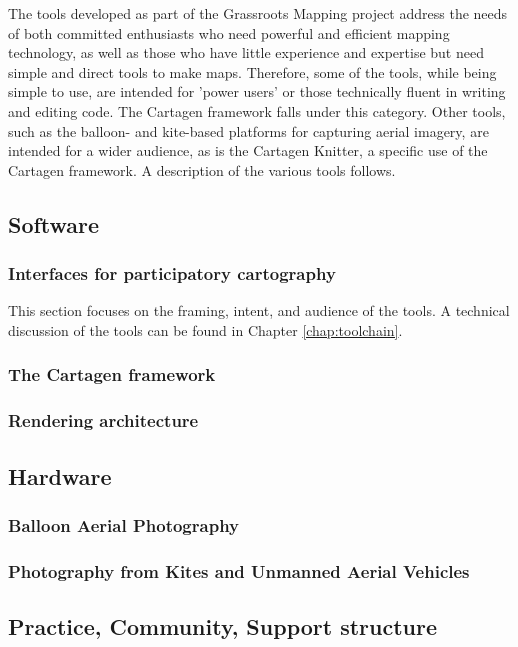 \documentclass[11pt]{report}
\begin{document}
The tools developed as part of the Grassroots Mapping project address the needs of both committed enthusiasts who need powerful and efficient mapping technology, as well as those who have little experience and expertise but need simple and direct tools to make maps. Therefore, some of the tools, while being simple to use, are intended for 'power users' or those technically fluent in writing and editing code. The Cartagen framework falls under this category. Other tools, such as the balloon- and kite-based platforms for capturing aerial imagery, are intended for a wider audience, as is the Cartagen Knitter, a specific use of the Cartagen framework. A description of the various tools follows.

\subsection{Software}

\subsubsection{Interfaces for participatory cartography}

This section focuses on the framing, intent, and audience of the tools. A technical discussion of the tools can be found in Chapter \ref{chap:toolchain}. 

\subsubsection{The Cartagen framework}
\subsubsection*{Rendering architecture}
\subsection{Hardware}
\subsubsection{Balloon Aerial Photography}
\subsubsection{Photography from Kites and Unmanned Aerial Vehicles}
\subsection{Practice, Community, Support structure}
\end{document}
